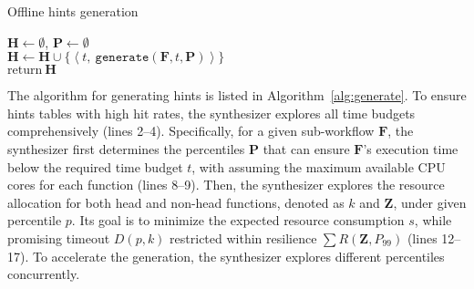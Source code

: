 \begin{algorithm}[!t]
\small
\caption{Offline hints generation\label{alg:generate}}
 	\LinesNumbered    
    $\mathbf{H} \leftarrow \emptyset$, $\mathbf{P} \leftarrow \emptyset$   \\
    {
    $\mathbf{H} \leftarrow \mathbf{H} \cup \{ \left \langle t, ~\texttt{generate}(\mathbf{F},t,\mathbf{P}) \right \rangle \}$ \\
    $\text{return}~\mathbf{H}$
    }
    
\end{algorithm}

The algorithm for generating hints is listed in Algorithm~\ref{alg:generate}.
To ensure hints tables with high hit rates, the synthesizer explores all time budgets comprehensively (lines 2--4). 
Specifically, for a given sub-workflow $\mathbf{F}$, the synthesizer first determines the percentiles $\mathbf{P}$ that can ensure $\mathbf{F}$'s execution time below the required time budget $t$, with assuming the maximum available CPU cores for each function (lines 8--9).
Then, the synthesizer explores the resource allocation for both head and non-head functions, denoted as $k$ and $\mathbf{Z}$, under given percentile $p$. Its goal is to minimize the expected resource consumption $s$, while promising timeout $ D(p,k)$ restricted within resilience $\sum{R(\mathbf{Z},P_{99})}$ (lines 12--17).
To accelerate the generation, the synthesizer explores different percentiles concurrently.

